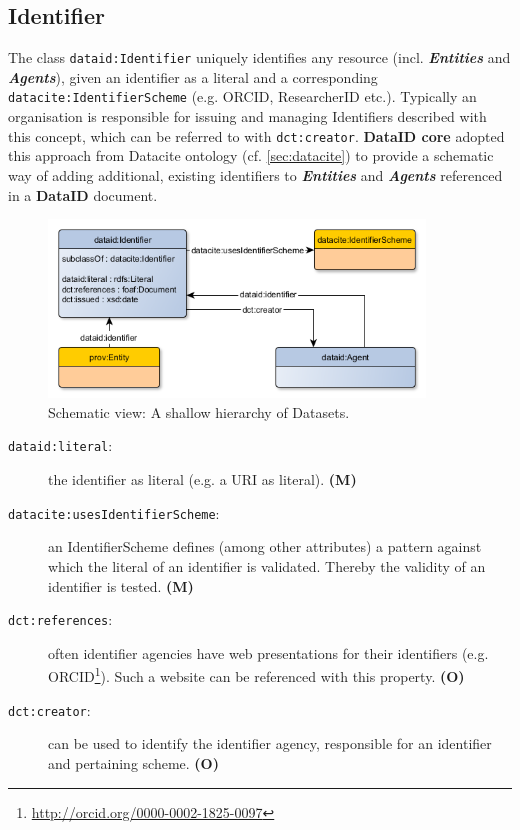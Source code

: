 \documentclass[a4paper,english,twoside,BCOR1.5cm,headsepline,DIV12,appendixprefix,final,12pt]{scrbook}
\newcommand{\dataid}{{\ttfamily\bfseries DataID}\xspace}
\newcommand{\core}{{\ttfamily\bfseries DataID core}\xspace}
\newcommand{\prop}[1]{{{\texttt{#1}}}}
\newcommand{\important}[1]{\textbf{\textit{#1}}}
\newcommand\footnoteurl[1]{\footnote{\scriptsize\url{#1}}}
\begin{document}
\subsection{Identifier} 
\label{sec:coreidentifier}
The class \prop{dataid:Identifier} uniquely identifies any resource (incl. \important{Entities} and \important{Agents}), given an identifier as a literal and a corresponding \prop{datacite:IdentifierScheme} (e.g. ORCID, ResearcherID etc.). Typically an organisation is responsible for issuing and managing Identifiers described with this concept, which can be referred to with \prop{dct:creator}. \core adopted this approach from Datacite ontology (cf. \cref{sec:datacite}) to provide a schematic way of adding additional, existing identifiers to \important{Entities} and \important{Agents} referenced in a \dataid document.
\begin{figure}[!htbp]
\centering
  \includegraphics[width=10cm]{images/ClassIdentifier.png}
  \caption{Schematic view: A shallow hierarchy of Datasets.}
  \label{fig:example}
\end{figure}

\begin{description}
\item[\prop{dataid:literal}:] the identifier as literal (e.g. a URI as literal). \textbf{(M)}
\item[\prop{datacite:usesIdentifierScheme}:] an IdentifierScheme defines (among other attributes) a pattern against which the literal of an identifier is validated. Thereby the validity of an identifier is tested. \textbf{(M)}
\item[\prop{dct:references}:] often identifier agencies have web presentations for their identifiers (e.g. ORCID\footnoteurl{http://orcid.org/0000-0002-1825-0097}). Such a website can be referenced with this property. \textbf{(O)}
\item[\prop{dct:creator}:] can be used to identify the identifier agency, responsible for an identifier and pertaining scheme. \textbf{(O)}
\end{description}
\end{document}
